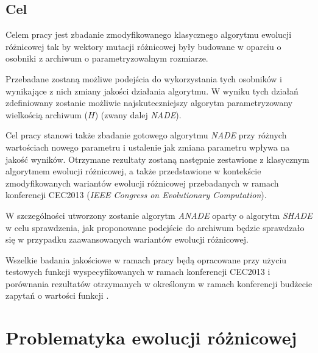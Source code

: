 \documentclass[12pt,a4paper]{report}
\begin{document}
{\section{Cel}
\par{
Celem pracy jest zbadanie zmodyfikowanego klasycznego algorytmu ewolucji różnicowej tak by wektory mutacji różnicowej były budowane w oparciu o osobniki z archiwum o parametryzowalnym rozmiarze.
}
\par{
Przebadane zostaną możliwe podejścia do wykorzystania tych osobników i wynikające z nich zmiany jakości działania algorytmu. W wyniku tych działań zdefiniowany zostanie możliwie najskuteczniejszy algorytm parametryzowany wielkością archiwum ($H$) (zwany dalej \emph{NADE}).
}
\par{
Cel pracy stanowi także zbadanie gotowego algorytmu \emph{NADE} przy różnych wartościach nowego parametru i ustalenie jak zmiana parametru wpływa na jakość wyników. Otrzymane rezultaty zostaną następnie zestawione z klasycznym algorytmem ewolucji różnicowej, a także przedstawione w kontekście zmodyfikowanych wariantów ewolucji różnicowej przebadanych w ramach konferencji CEC2013 (\emph{IEEE Congress on Evolutionary Computation}).
}
\par{
W szczególności utworzony zostanie algorytm \emph{ANADE} oparty o algorytm \emph{SHADE} \cite{SHADE} w celu sprawdzenia, jak proponowane podejście do archiwum będzie sprawdzało się w przypadku zaawansowanych wariantów ewolucji różnicowej.
}
\par{
Wszelkie badania jakościowe w ramach pracy będą opracowane przy użyciu testowych funkcji wyspecyfikowanych w ramach konferencji CEC2013 i porównania rezultatów otrzymanych w określonym w ramach konferencji budżecie zapytań o wartości funkcji \cite{Li13benchmarkfunctions}.
}




\chapter{Problematyka ewolucji różnicowej}
}
\end{document}
